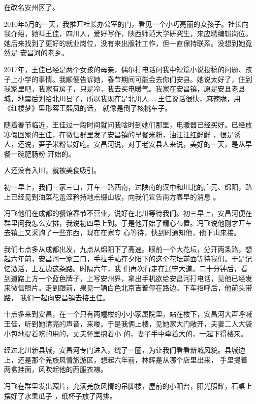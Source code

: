 \documentclass{article}
\begin{document}
在改名安州区了。 

2010年5月的一天，我推开社长办公室的门，看见一个小巧亮丽的女孩子。社长向我介绍，她叫王佳，四川人，爱好写作，陕西师范大学研究生，来应聘编辑岗位。她后来找到了更好的就业岗位，没有来出版社工作，但一直保持联系。没想到她竟然是
安昌河的老乡。 

2017年，王佳已经是两个女孩的母亲，偶尔打电话问我中短篇小说投稿的问题、孩子上小学的事情。我顺便告诉她，春节期间可能会去你们安县。她说太好了，住到我家里吧，我家有房子，只是冷，我去买电暖气。我家在安昌镇，原是安县老县城，地震后划给北川县了，所以我现在是北川人……王佳说话很快，麻辣脆，用《红楼梦》里形容王熙凤的话，
就像是倒了核桃车子。 

随着春节临近，王佳过一段时间就问我啥时到她们那里，电暖器已经买好。已经放寒假回家的王佳，在微信群里发了安昌镇的早餐米粉，油汪汪红鲜鲜
\newpage
，很是诱人，还说，笋子米粉最好吃。安昌河说，对于老安县人来说，美好的一天，是从早餐一碗肥肠粉
开始的。 


人还没有入川，就被美食吸引。 

初一早上，我们一家三口，开车一路西南，过陕南的汉中和川北的广元、绵阳，路上已经见到油菜花羞涩矜持地点缀山坡，向我们宣告南方春早的消息
。 

冯飞他们在成都的餐馆春节不营业，说好在北川等待我们。初三早上，安昌河便在群里问我怎么安排，我说初四早上到。于是他开始了精心布置。冯飞说他刚才开车去镇上又采购了一些东西，现在在家专
心等待，快到时通知他，他下山来接。 

我们七点多从成都出发，九点从绵阳下了高速。眼前一个大花坛，分开两条路，想起六年前，安昌河一家三口，手拉手站在夕阳下的这个花坛前面等待我们。于是记忆激活，上左边这条路。时隔六年，我
\newpage
们再次行走在辽宁大道。二十分钟后，看到道路上方一个蓝色牌子，上写安州界，拿出手机欲给安昌河打电话，见他已经发来微信照片。走到跟前，果见一辆白色北京吉普停在路边。下车招呼后，他前头带路，
我们一起向安昌镇去接王佳。 

十点多来到安昌，在一个只有两幢楼的小小家属院里，站在楼下，安昌河大声呼喊王佳，听到她清亮的声音，来喽。于是我俩上楼，见她家大门敞开，夫妻二人大袋小包地提着吃的用的，丈夫怀里抱着小
的，妻子手中牵着大的，一起下得楼来。 

经过北川新县城，安昌河专门进入，绕了一圈，为让我们看看新城风貌。县城边上，还是那个羌族风情旅游区，想起六年前，林辉是从哪个店里出来，
手里提着两盒挂面，风吹起他的西服衣襟。 

冯飞在群里发出照片，充满羌族风情的吊脚楼，屋前的小阳台，阳光照耀，石桌上摆好了水果瓜子
，纸杯子放了两排。 

\newpage
\end{document}

